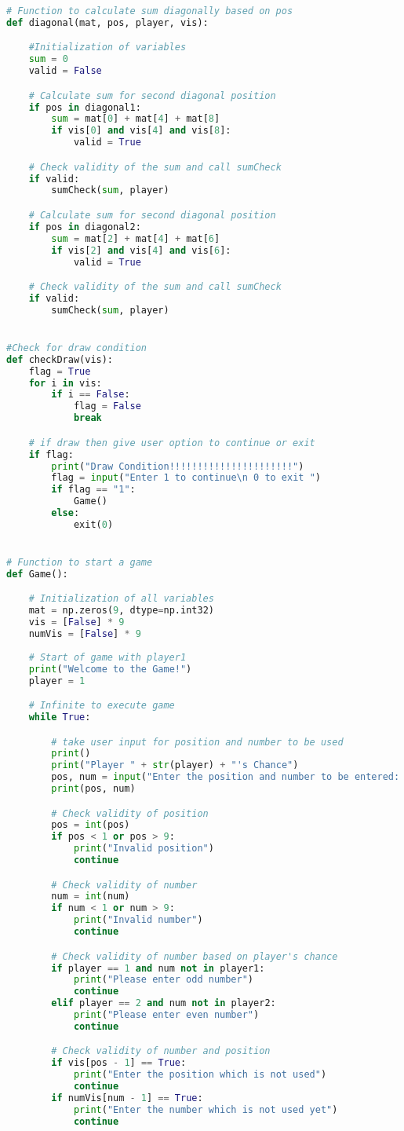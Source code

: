 \documentclass[11pt,oneside]{book}
\begin{document}
\begin{appendices}
\begin{lstlisting}[language=Python, frame='single']
# Function to calculate sum diagonally based on pos
def diagonal(mat, pos, player, vis):

	#Initialization of variables
	sum = 0
	valid = False

	# Calculate sum for second diagonal position
	if pos in diagonal1:
		sum = mat[0] + mat[4] + mat[8]
		if vis[0] and vis[4] and vis[8]:
			valid = True

	# Check validity of the sum and call sumCheck
	if valid:
		sumCheck(sum, player)

	# Calculate sum for second diagonal position
	if pos in diagonal2:
		sum = mat[2] + mat[4] + mat[6]
		if vis[2] and vis[4] and vis[6]:
			valid = True

	# Check validity of the sum and call sumCheck
	if valid:
		sumCheck(sum, player)


#Check for draw condition
def checkDraw(vis):
	flag = True
	for i in vis:
		if i == False:
			flag = False
			break

	# if draw then give user option to continue or exit
	if flag:
		print("Draw Condition!!!!!!!!!!!!!!!!!!!!!!")
		flag = input("Enter 1 to continue\n 0 to exit ")
		if flag == "1":
			Game()
		else:
			exit(0)


# Function to start a game
def Game():

	# Initialization of all variables
	mat = np.zeros(9, dtype=np.int32)
	vis = [False] * 9
	numVis = [False] * 9
	
	# Start of game with player1
	print("Welcome to the Game!")
	player = 1

	# Infinite to execute game
	while True:

		# take user input for position and number to be used
		print()
		print("Player " + str(player) + "'s Chance")
		pos, num = input("Enter the position and number to be entered: ").split(",")
		print(pos, num)

		# Check validity of position
		pos = int(pos)
		if pos < 1 or pos > 9:
			print("Invalid position")
			continue

		# Check validity of number
		num = int(num)
		if num < 1 or num > 9:
			print("Invalid number")
			continue

		# Check validity of number based on player's chance
		if player == 1 and num not in player1:
			print("Please enter odd number")
			continue
		elif player == 2 and num not in player2:
			print("Please enter even number")
			continue

		# Check validity of number and position 
		if vis[pos - 1] == True:
			print("Enter the position which is not used")
			continue
		if numVis[num - 1] == True:
			print("Enter the number which is not used yet")
			continue


\end{lstlisting}
\end{appendices}
\end{document}

